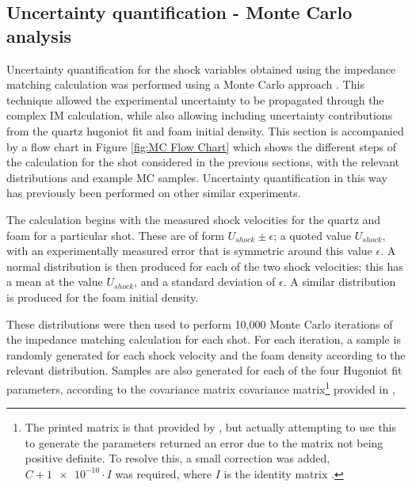 \subsection{Uncertainty quantification - Monte Carlo analysis} \label{MC error}

Uncertainty quantification for the shock variables obtained using the impedance matching calculation was performed using a Monte Carlo approach \cite{Root2010}. This technique allowed the experimental uncertainty to be propagated through the complex IM calculation, while also allowing including uncertainty contributions from the quartz hugoniot fit and foam initial density. This section is accompanied by a flow chart in Figure \ref{fig:MC Flow Chart} which shows the different steps of the calculation for the shot considered in the previous sections, with the relevant distributions and example MC samples. Uncertainty quantification in this way has previously been performed on other similar experiments.


The calculation begins with the measured shock velocities for the quartz and foam for a particular shot. These are of form $U_{shock} \pm \epsilon$; a quoted value $U_{shock}$, with an experimentally measured error that is symmetric around this value $\epsilon$. A normal distribution is then produced for each of the two shock velocities; this has a mean at the value $U_{shock}$, and a standard deviation of $\epsilon$. A similar distribution is produced for the foam initial density.

These distributions were then used to perform 10,000 Monte Carlo iterations of the impedance matching calculation for each shot. For each iteration, a sample is randomly generated for each shock velocity and the foam density according to the relevant distribution. Samples are also generated for each of the four Hugoniot fit parameters, according to the covariance matrix covariance matrix\footnote{The printed matrix is that provided by \cite{Knudson2013}, but actually attempting to use this to generate the parameters returned an error due to the matrix not being positive definite. To resolve this, a small correction was added, $C + \num{1e-10}\cdot I$ was required, where $I$ is the identity matrix \cite{Holton2003}.}  provided in \cite{Knudson2013},

